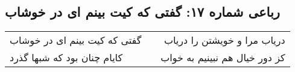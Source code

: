 \begin{center}
\section*{رباعی شماره ۱۷: گفتی که کیت بینم ای در خوشاب}
\label{sec:sh017}
\begin{longtable}{l p{0.5cm} r}
گفتی که کیت بینم ای در خوشاب
&&
دریاب مرا و خویشتن را دریاب
\\
کایام چنان بود که شبها گذرد
&&
کز دور خیال هم نبینیم به خواب
\\
\end{longtable}
\end{center}
